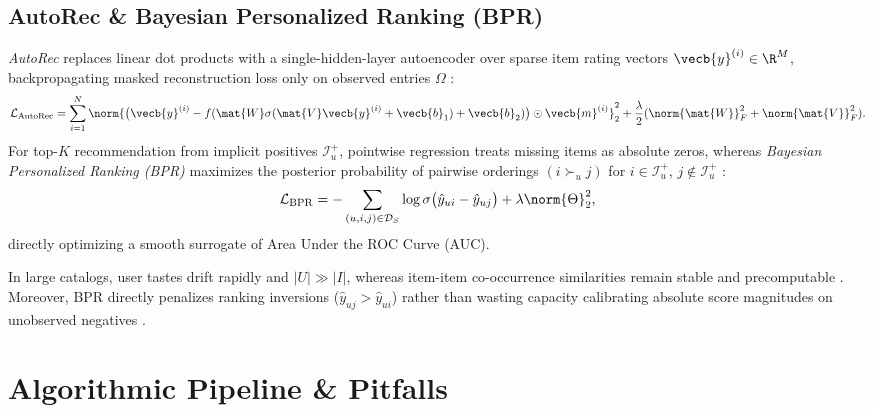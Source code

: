\documentclass[../../../../master.tex]{subfiles}
\begin{document}
\subsection{AutoRec \& Bayesian Personalized Ranking (BPR)}

\begin{coremath}
\emph{AutoRec} replaces linear dot products with a single-hidden-layer autoencoder over sparse item rating vectors $\vecb{y}^{(i)} \in \R^M$, backpropagating masked reconstruction loss only on observed entries $\Omega$ :
\begin{equation}
  \mathcal{L}_{\mathrm{AutoRec}} = \sum_{i=1}^N \norm{\bigl(\vecb{y}^{(i)} - f(\mat{W}\sigma(\mat{V}\vecb{y}^{(i)} + \vecb{b}_1) + \vecb{b}_2)\bigr) \odot \vecb{m}^{(i)}}_2^2 + \frac{\lambda}{2}(\norm{\mat{W}}_F^2 + \norm{\mat{V}}_F^2).
\end{equation}
For top-$K$ recommendation from implicit positives $\mathcal{I}_u^+$, pointwise regression treats missing items as absolute zeros, whereas \emph{Bayesian Personalized Ranking (BPR)} maximizes the posterior probability of pairwise orderings $(i \succ_u j)$ for $i \in \mathcal{I}_u^+$, $j \notin \mathcal{I}_u^+$ :
\begin{equation}
  \mathcal{L}_{\mathrm{BPR}} = -\sum_{(u, i, j) \in \mathcal{D}_S} \log \sigma\bigl(\hat{y}_{ui} - \hat{y}_{uj}\bigr) + \lambda \norm{\Theta}_2^2,
\end{equation}
directly optimizing a smooth surrogate of Area Under the ROC Curve (AUC).
\end{coremath}

\begin{intuition}
In large catalogs, user tastes drift rapidly and $|U| \gg |I|$, whereas item-item co-occurrence similarities remain stable and precomputable . Moreover, BPR directly penalizes ranking inversions ($\hat{y}_{uj} > \hat{y}_{ui}$) rather than wasting capacity calibrating absolute score magnitudes on unobserved negatives .
\end{intuition}

\section{Algorithmic Pipeline \& Pitfalls}
\end{document}
